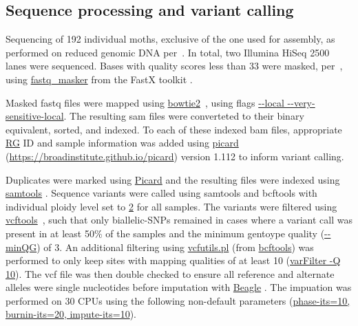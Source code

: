 \documentclass[fleqn,11pt]{wlpeerj}
\begin{document}
\subsection*{Sequence processing and variant calling} Sequencing of 192
individual moths, exclusive of the one used for assembly,  as performed on
reduced genomic DNA per~\cite{PARCHMAN:2012ca}. In total, two  Illumina HiSeq
2500 lanes were sequenced. Bases with quality scores less than 33 were masked,
per~\cite{Yun:2014dn},  using \url{fastq\_masker} from the FastX toolkit
\citep[][version 0.0.14]{citeulike:9103573}.

Masked fastq files were mapped using \url{bowtie2}~\citep[][version
2.2.4]{Langmead:2012jh}, using flags  \url{--local
--very-sensitive-local}.  The resulting  sam files were converteted to their
binary equivalent, sorted, and indexed. To each of these indexed bam files,
appropriate \url{RG} ID and sample information was added using
\url{picard} \\ (\url{https://broadinstitute.github.io/picard}) version 1.112
to inform variant calling.

Duplicates were marked using \url{Picard} and the resulting files were
indexed using \url{samtools} \citep[][version 1.2]{Li:2009ka}.  Sequence
variants were called using samtools and bcftools \citep[][version
1.2]{Li:2009ka} with individual  ploidy level set to \url{2} for all samples.
The variants were filtered  using \url{vcftools}~\citep[][version
0.1.14]{Danecek:2011gz}, such that only biallelic-SNPs remained in cases where a
variant call was present in at least 50\% of the samples and the minimum
gentoype quality (\url{--minQG}) of 3. An additional filtering using
\url{vcfutils.pl} (from \url{bcftools}) was performed to only keep sites
with mapping qualities of at least 10 (\url{varFilter -Q 10}). The vcf file
was then double checked to ensure all reference and alternate alleles were
single nucleotides before imputation with \url{Beagle}
\citep[][version 4.0]{Browning:2007ge}.  The impuation was performed on 30 CPUs
using the following non-default parameters (\url{phase-its=10, burnin-its=20,
impute-its=10}).
\end{document}
